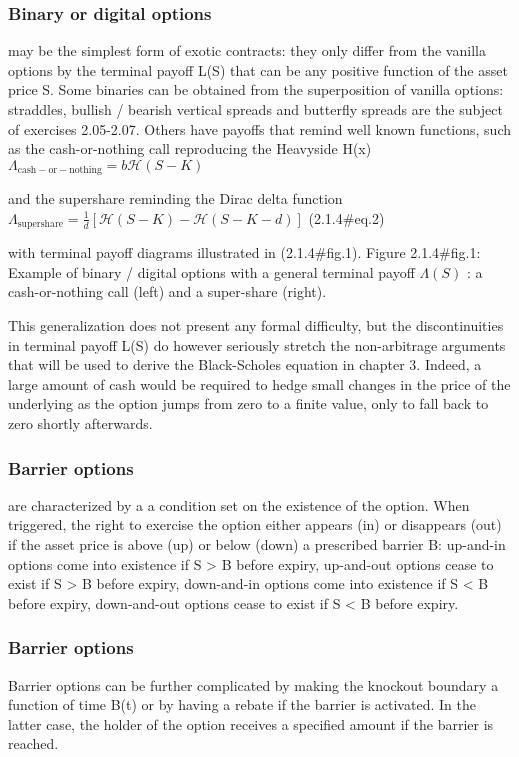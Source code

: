 \documentclass{beamer}
\begin{document}


\begin{frame}
\frametitle{Binary or digital options}
may be the simplest form of exotic contracts: they only differ from the vanilla options by the terminal payoff L(S)   that can be any positive function of the asset price S. Some binaries can be obtained from the superposition of vanilla options: straddles, bullish / bearish vertical spreads and butterfly spreads are the subject of exercises 2.05-2.07. Others have payoffs that remind well known functions, such as the cash-or-nothing call reproducing the Heavyside H(x)
 $\displaystyle \Lambda_\mathrm{cash-or-nothing} =b \mathcal{H}(S-K)$	 


\end{frame}
\begin{frame}
and the supershare reminding the Dirac delta function
 $\displaystyle \Lambda_\mathrm{supershare} =\frac{1}{d}[\mathcal{H}(S-K) -\mathcal{H}(S-K-d)]$	 (2.1.4#eq.2)


with terminal payoff diagrams illustrated in (2.1.4#fig.1).
Figure 2.1.4#fig.1: Example of binary / digital options with a general terminal payoff  $ \Lambda (S)$ : a cash-or-nothing call (left) and a super-share (right).


\end{frame}
\begin{frame}
This generalization does not present any formal difficulty, but the discontinuities in terminal payoff L(S)   do however seriously stretch the non-arbitrage arguments that will be used to derive the Black-Scholes equation in chapter 3. Indeed, a large amount of cash would be required to hedge small changes in the price of the underlying as the option jumps from zero to a finite value, only to fall back to zero shortly afterwards.

\end{frame}
\begin{frame}
\frametitle{Barrier options}

are characterized by a a condition set on the existence of the option. When triggered, the right to exercise the option either appears (in) or disappears (out) if the asset price is above (up) or below (down) a prescribed barrier B:
up-and-in options come into existence if S > B before expiry,  
up-and-out options cease to exist if S > B before expiry,  
down-and-in options come into existence if S < B before expiry,  
down-and-out options cease to exist if S < B before expiry.  
\end{frame}
\begin{frame}
\frametitle{Barrier options}
Barrier options can be further complicated by making the knockout boundary a function of time B(t) or by having a rebate if the barrier is activated. In the latter case, the holder of the option receives a specified amount if the barrier is reached.
\end{frame}

\end{document}
